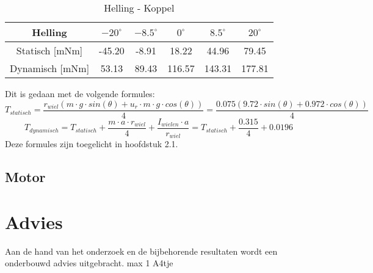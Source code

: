 \documentclass{article}
\begin{document}
        \begin{table}[h]
            \centering
            \begin{tabular}{|c|c|c|c|c|c|}
            \hline
            Helling & $-20 ^\circ$ & $-8.5 ^\circ$ & $0 ^\circ$ & $8.5 ^\circ$ & $20 ^\circ$ \\ \hline
            Statisch [mNm]  & -45.20   & -8.91   & 18.22   & 44.96  & 79.45   \\ \hline
            Dynamisch [mNm]  & 53.13  & 89.43   & 116.57  & 143.31  & 177.81  \\ \hline
            \end{tabular}
            \caption{Helling - Koppel}
            \label{tab}
        \end{table}
        Dit is gedaan met de volgende formules:
        $$T_{statisch} = \frac{r_{wiel}(m \cdot g \cdot sin(\theta) + u_r \cdot m \cdot g \cdot cos(\theta))}{4} = \frac{0.075(9.72 \cdot sin(\theta) +  0.972 \cdot cos(\theta))}{4}$$
        $$T_{dynamisch} = T_{statisch} + \frac{m \cdot a \cdot r_{wiel}}{4} + \frac{I_{wielen} \cdot a}{r_{wiel}} = T_{statisch} + \frac{0.315}{4}+ 0.0196 $$
        Deze formules zijn toegelicht in hoofdstuk 2.1.    
        
    \subsection{Motor}
        


\section{Advies}
    Aan de hand van het onderzoek en de
    bijbehorende resultaten wordt een onderbouwd
    advies uitgebracht. max 1 A4tje

\appendix
\end{document}
